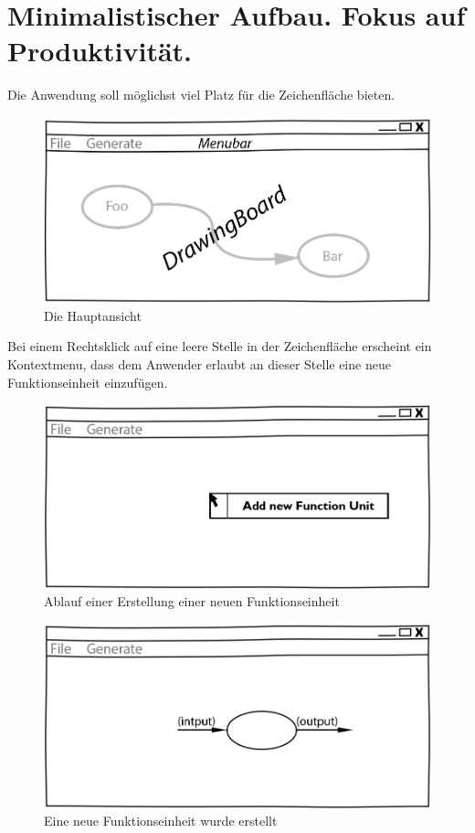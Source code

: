 \section{Minimalistischer Aufbau. Fokus auf Produktivität.}

Die Anwendung soll möglichst viel Platz für die Zeichenfläche
bieten.

\begin{figure}[H]
	\centering
\includegraphics[width=.9\linewidth]{./img/MainCrop.jpg}
	\caption{Die Hauptansicht}
\end{figure}

Bei einem Rechtsklick auf eine leere Stelle in der Zeichenfläche erscheint ein Kontextmenu, dass dem Anwender erlaubt an dieser Stelle eine neue Funktionseinheit einzufügen.

\begin{figure}[H]
	\centering
	\includegraphics[width=.9\linewidth]{./img/ContextMenu.jpg}
	\caption{Ablauf einer Erstellung einer neuen Funktionseinheit}
\end{figure}


\begin{figure}[H]
	\centering
\includegraphics[width=.9\linewidth]{./img/NewCell.jpg}
	\caption{Eine neue Funktionseinheit wurde erstellt}
\end{figure}




